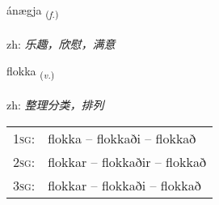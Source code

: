 \documentclass[frontgrid, backgrid]{flacards}\usepackage[]{graphicx}\usepackage[]{color}
\begin{document}
\renewcommand{\flhead}{\vskip5pt \fboxsep=0pt {\small\bfseries\footnotesize Nafnorð | 名词}}
\renewcommand{\fcfoot}{\vskip5pt \fboxsep=0pt \hspace{2pt}{\small\bfseries\footnotesize 2K}}

\renewcommand{\blhead}{\vskip5pt {\small\bfseries\footnotesize Nafnorð | 名词 }}
\renewcommand{\bcfoot}{\vskip5pt \hspace{2pt}{\small\bfseries\footnotesize 2K}}


{ánægja \small{\textsubscript{(\textit{f.})}} \\[1ex] %
\textphonetic{[auːnaija]} \\
zh: \emph{乐趣，欣慰，满意} \\  [2ex]
\renewcommand*{\arraystretch}{0.8}
}

\renewcommand{\flhead}{\vskip5pt \fboxsep=0pt {\small\bfseries\footnotesize Sagnorð | 动词}}
\renewcommand{\fcfoot}{\vskip5pt \fboxsep=0pt \hspace{2pt}{\small\bfseries\footnotesize 2K}}

\renewcommand{\blhead}{\vskip5pt {\small\bfseries\footnotesize Sagnorð | 动词 }}
\renewcommand{\bcfoot}{\vskip5pt \hspace{2pt}{\small\bfseries\footnotesize 2K}}


{flokka \small{\textsubscript{(\textit{v.})}} \\[1ex] %
\textphonetic{[flɔhka]} \\
zh: \emph{整理分类，排列} \\  [2ex]
\renewcommand*{\arraystretch}{0.8}
\begin{tabular}{p{1cm}l}
\textsc{1sg}: & flokka -- flokkaði -- flokkað \\ 
\textsc{2sg}: & flokkar -- flokkaðir -- flokkað \\ 
\textsc{3sg}: & flokkar -- flokkaði -- flokkað \\ 
\end{tabular}
}
\end{document}
